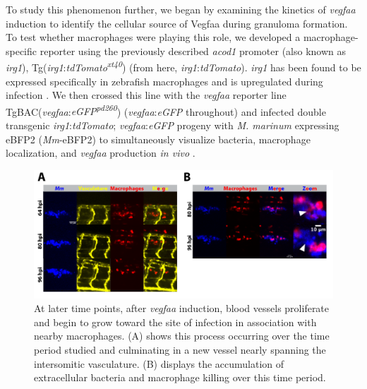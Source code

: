 To study this phenomenon further, we began by examining the kinetics of \textit{vegfaa} induction to identify the cellular source of Vegfaa during granuloma formation. To test whether macrophages were playing this role, we developed a macrophage-specific reporter using the previously described \textit{acod1} promoter (also known as \textit{irg1}), Tg(\textit{irg1}:\textit{tdTomato\textsuperscript{xt40}}) (from here, \textit{irg1}:\textit{tdTomato}). \textit{irg1} has been found to be expressed specifically in zebrafish macrophages and is upregulated during infection \citep{Sanderson2015, Kwon2022}. We then crossed this line with the \textit{vegfaa} reporter line TgBAC(\textit{vegfaa}:\textit{eGFP\textsuperscript{pd260}}) (\textit{vegfaa}:\textit{eGFP} throughout) \citep{Karra2018} and infected double transgenic \textit{irg1}:\textit{tdTomato}; \textit{vegfaa}:\textit{eGFP} progeny with \textit{M. marinum} expressing eBFP2 (\textit{Mm}-eBFP2) to simultaneously visualize bacteria, macrophage localization, and \textit{vegfaa} production \textit{in vivo} \citep{Takaki2013}.

\begin{figure}
\centering
\includegraphics[width=\textwidth]{images/extracellularflk1.pdf}
\caption{At later time points, after \textit{vegfaa} induction, blood vessels proliferate and begin to grow toward the site of infection in association with nearby macrophages. (A) shows this process occurring over the time period studied and culminating in a new vessel nearly spanning the intersomitic vasculature. (B) displays the accumulation of extracellular bacteria and macrophage killing over this time period.}
\label{figure:ecflk1}

\end{figure}

